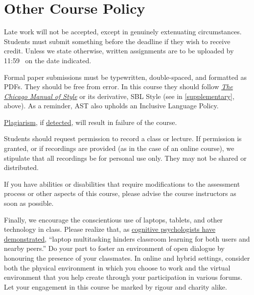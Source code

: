 \documentclass[titlepage]{article}
\newcommand\policy{../policy}
\begin{document}

%

\section{Other Course Policy}
\label{policy}

Late work will not be accepted, except in genuinely extenuating
circumstances. Students must submit something before the deadline if
they wish to receive credit. Unless we state otherwise, written
assignments are to be uploaded by 11:59 \PM\ on the date indicated.

Formal paper submissions must be typewritten, double-spaced, and formatted as
PDFs. They should be free from error. In this course they should follow
\href{http://www.chicagomanualofstyle.org/home.html}{\emph{The Chicago
Manual of Style}} or its derivative, SBL Style (see \cite{sbl2} in
\autoref{supplementary}, above). As a reminder, AST also upholds an
Inclusive Language Policy.

\href{http://www.eerdmans.com/Pages/Item/59043/Commentary-Statement.aspx}{Plagiarism},
if \href{https://www.theguardian.com/world/2013/feb/09/german-education-minister-quits-phd-plagiarism}{detected},
will result in failure of the course.

Students should request permission to record a class or lecture. If
permission is granted, or if recordings are provided (as in the case of
an online course), we stipulate that all recordings be for personal use
only. They may not be shared or distributed.

If you have abilities or disabilities that require modifications to the
assessment process or other aspects of this course, please advise the
course instructors as soon as possible.

Finally, we encourage the conscientious use of laptops, tablets, and
other technology in class. Please realize that, as
\href{http://dx.doi.org/10.1016/j.compedu.2012.10.003}{cognitive
psychologists have demonstrated}, ``laptop multitasking hinders
classroom learning for both users and nearby peers.'' Do your part to
foster an environment of open dialogue by honouring the presence of your
classmates. In online and hybrid settings, consider both the physical
environment in which you choose to work and the virtual environment that
you help create through your participation in various forums. Let your
engagement in this course be marked by rigour and charity alike.
\end{document}
